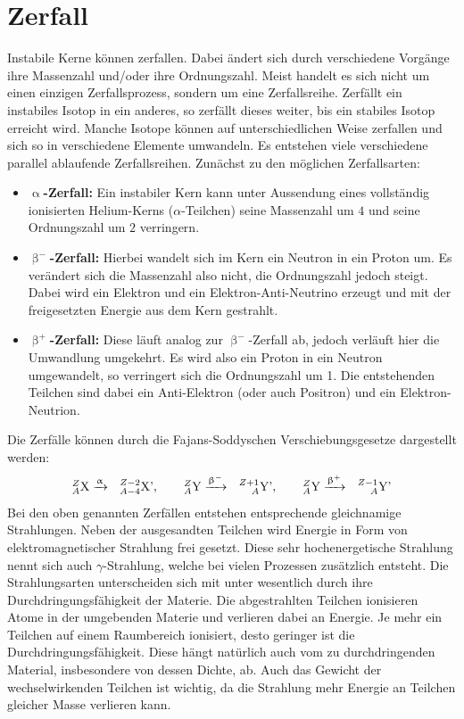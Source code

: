\section{Zerfall}
Instabile Kerne können zerfallen. Dabei ändert sich durch verschiedene Vorgänge ihre Massenzahl und/oder ihre Ordnungszahl. Meist handelt es sich nicht um einen einzigen Zerfallsprozess, sondern um eine Zerfallsreihe. Zerfällt ein instabiles Isotop in ein anderes, so zerfällt dieses weiter, bis ein stabiles Isotop erreicht wird. Manche Isotope können auf unterschiedlichen Weise zerfallen und sich so in verschiedene Elemente umwandeln. Es entstehen viele verschiedene parallel ablaufende Zerfallsreihen. Zunächst zu den möglichen Zerfallsarten:
\begin{itemize}
 \item{\textbf{$\upalpha$-Zerfall:}} Ein instabiler Kern kann unter Aussendung eines vollständig ionisierten Helium-Kerns ($\alpha$-Teilchen) seine Massenzahl um $4$ und seine Ordnungszahl um $2$ verringern.
 \item{\textbf{$\upbeta^-$-Zerfall:}} Hierbei wandelt sich im Kern ein Neutron in ein Proton um. Es verändert sich die Massenzahl also nicht, die Ordnungszahl jedoch steigt. Dabei wird ein Elektron und ein Elektron-Anti-Neutrino erzeugt und mit der freigesetzten Energie aus dem Kern gestrahlt.
 \item{\textbf{$\upbeta^+$-Zerfall:}} Diese läuft analog zur $\upbeta^-$-Zerfall ab, jedoch verläuft hier die Umwandlung umgekehrt. Es wird also ein Proton in ein Neutron umgewandelt, so verringert sich die Ordnungszahl um 1. Die entstehenden Teilchen sind dabei ein Anti-Elektron (oder auch Positron) und ein Elektron-Neutrion.
\end{itemize}
Die Zerfälle können durch die Fajans-Soddyschen Verschiebungsgesetze dargestellt werden:
\begin{equation}
\element{X}{A}{Z} \xrightarrow{\upalpha} ~~\element{X'}{A - 4}{Z - 2},\qquad \element{Y}{A}{Z} \xrightarrow{\upbeta^-} ~~\element{Y'}{A}{Z + 1},\qquad \element{Y}{A}{Z} \xrightarrow{\upbeta^+} ~~\element{Y'}{A}{Z - 1}
\end{equation}
Bei den oben genannten Zerfällen entstehen entsprechende gleichnamige Strahlungen. Neben der ausgesandten Teilchen wird Energie in Form von elektromagnetischer Strahlung frei gesetzt. Diese sehr hochenergetische Strahlung nennt sich auch $\gamma$-Strahlung, welche bei vielen Prozessen zusätzlich entsteht. Die Strahlungsarten unterscheiden sich mit unter wesentlich durch ihre Durchdringungsfähigkeit der Materie. Die abgestrahlten Teilchen ionisieren Atome in der umgebenden Materie und verlieren dabei an Energie. Je mehr ein Teilchen auf einem Raumbereich ionisiert, desto geringer ist die Durchdringungsfähigkeit. Diese hängt natürlich auch vom zu durchdringenden Material, insbesondere von dessen Dichte, ab. Auch das Gewicht der wechselwirkenden Teilchen ist wichtig, da die Strahlung mehr Energie an Teilchen gleicher Masse verlieren kann.\\
